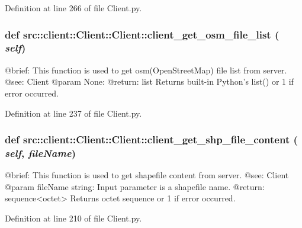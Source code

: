 Definition at line 266 of file Client.py.

\hypertarget{classsrc_1_1client_1_1Client_1_1Client_a034e75b4d258f1390f2c1a0d71f05897}{
\subsubsection[{client\_\-get\_\-osm\_\-file\_\-list}]{\setlength{\rightskip}{0pt plus 5cm}def src::client::Client::Client::client\_\-get\_\-osm\_\-file\_\-list ( {\em self})}}
\label{classsrc_1_1client_1_1Client_1_1Client_a034e75b4d258f1390f2c1a0d71f05897}
\begin{DoxyVerb}
@brief: This function is used to get osm(OpenStreetMap) file list from server.
@see: Client
@param None:
@return: list Returns built-in Python's list() or 1 if error occurred. 
\end{DoxyVerb}
 

Definition at line 237 of file Client.py.

\hypertarget{classsrc_1_1client_1_1Client_1_1Client_a0cf4d0ebe99c56c3b868d6c1b1c0d9b8}{
\subsubsection[{client\_\-get\_\-shp\_\-file\_\-content}]{\setlength{\rightskip}{0pt plus 5cm}def src::client::Client::Client::client\_\-get\_\-shp\_\-file\_\-content ( {\em self}, \/   {\em fileName})}}
\label{classsrc_1_1client_1_1Client_1_1Client_a0cf4d0ebe99c56c3b868d6c1b1c0d9b8}
\begin{DoxyVerb}
@brief: This function is used to get shapefile content from server.
@see: Client
@param fileName string: Input parameter is a shapefile name.
@return: sequence<octet> Returns octet sequence or 1 if error occurred. 
\end{DoxyVerb}
 

Definition at line 210 of file Client.py.

